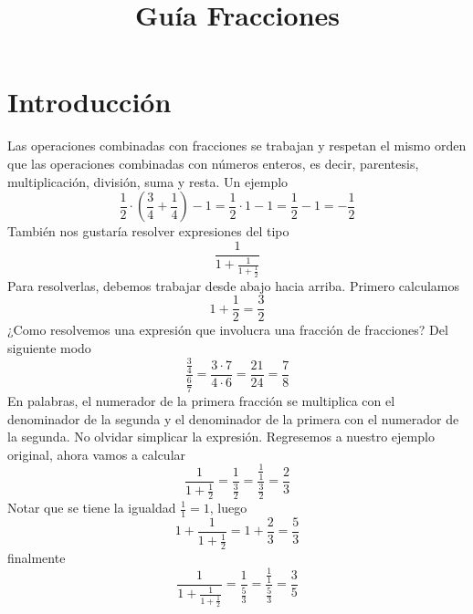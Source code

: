 \documentclass{article}
\title{Guía Fracciones}
\author{}
\date{}
\begin{document}
\maketitle

\section*{Introducción}
\noindent Las operaciones combinadas con fracciones se trabajan y respetan el mismo orden que las 
operaciones combinadas con números enteros, es decir, parentesis, multiplicación, división, suma y 
resta. Un ejemplo
\begin{equation*}
    \frac{1}{2}\cdot\left(\frac{3}{4}+\frac{1}{4}\right)-1=\frac{1}{2}\cdot1-1=\frac{1}{2}-1
    =-\frac{1}{2}
\end{equation*}
También nos gustaría resolver expresiones del tipo
\begin{equation*}
    \frac{1}{1+\frac{1}{1+\frac{1}{2}}}
\end{equation*}
Para resolverlas, debemos trabajar desde abajo hacia arriba. Primero calculamos
\begin{equation*}
    1+\frac{1}{2}=\frac{3}{2}
\end{equation*}
¿Como resolvemos una expresión que involucra una fracción de fracciones? Del siguiente modo
\begin{equation*}
    \frac{\frac{3}{4}}{\frac{6}{7}}=\frac{3\cdot7}{4\cdot6}=\frac{21}{24}=\frac{7}{8}
\end{equation*}
En palabras, el numerador de la primera fracción se multiplica con el denominador de la segunda y
el denominador de la primera con el numerador de la segunda. No olvidar simplicar la expresión. 
Regresemos a nuestro ejemplo original, ahora vamos a calcular
\begin{equation*}
    \frac{1}{1+\frac{1}{2}}=\frac{1}{\frac{3}{2}}=\frac{\frac{1}{1}}{\frac{3}{2}}=\frac{2}{3}
\end{equation*}
Notar que se tiene la igualdad $\frac{1}{1}=1$, luego
\begin{equation*}
    1+\frac{1}{1+\frac{1}{2}}=1+\frac{2}{3}=\frac{5}{3}
\end{equation*}
finalmente
\begin{equation*}
    \frac{1}{1+\frac{1}{1+\frac{1}{2}}}=\frac{1}{\frac{5}{3}}=\frac{\frac{1}{1}}{\frac{5}{3}}
    =\frac{3}{5}
\end{equation*}

\newpage
\end{document}

